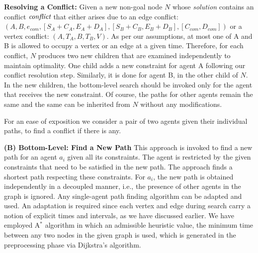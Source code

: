 \documentclass{article}
\begin{document}
{%
\noindent \textbf{Resolving a Conflict:}
Given a new non-goal node $N$ whose \emph{solution} contains an conflict $\emph{conflict}$ that either arises due to an edge conflict: $(A,B,e_{com},[S_A+C_A,E_A+D_A],[S_B+C_B,E_B+D_B], [C_{com},D_{com}])$ or a vertex conflict: $(A,T_A,B,T_B,V)$.
%
As per our assumptions, at most one of A and B is allowed to occupy a vertex or an edge at a given time. Therefore, for each conflict, $N$ produces two new children that are examined independently to maintain optimality. 
One child adds a new constraint for agent A following our conflict resolution step. Similarly, it is done for agent B, in the other child of $N$. 
In the new children, the bottom-level search should be invoked only for the agent that receives the new constraint. 
Of course, the paths for other agents remain the same and the same can be inherited from $N$ without any modifications. 

For an ease of exposition we consider a pair of two agents given their individual paths, to find a conflict if there is any.

\vspace{0.05cm}
\noindent \textbf{(B) Bottom-Level: Find a New Path}
This approach is invoked to find a new path for an agent $a_i$ given all its constraints.
The agent is restricted by the given constraints that need to be satisfied in the new path. The approach finds a shortest path respecting these constraints. For $a_i$, the new path is obtained independently in a decoupled manner, i.e., the presence of other agents in the graph is ignored. 
Any single-agent path finding algorithm can be adapted and used. An adaptation is required since each vertex and edge during search carry a notion of explicit times and intervals, as we have discussed earlier. We have employed A$^*$ algorithm in which an admissible heuristic value, the minimum time between any two nodes in the given graph is used, which is generated in the preprocessing phase via Dijkstra's algorithm. 

}
\end{document}
